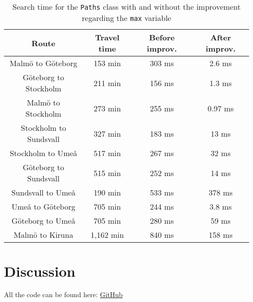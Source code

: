 \documentclass[a4paper,11pt]{article}
\begin{document}
\begin{table}[h!]
    \begin{center}
        \caption{Search time for the {\tt Paths} class with and without the improvement regarding the
                {\tt max} variable}
        \label{tab:Paths}
        \begin{tabular}{|c|c|c|c|}
            \hline
            \textbf{Route}         & \textbf{Travel time} & \textbf{Before improv.} & \textbf{After improv.} \\
            \hline
            Malmö to Göteborg      & 153 min              & 303 ms                  & 2.6 ms                 \\
            Göteborg to Stockholm  & 211 min              & 156 ms                  & 1.3 ms                 \\
            Malmö to Stockholm     & 273 min              & 255  ms                 & 0.97 ms                \\
            Stockholm to Sundsvall & 327 min              & 183  ms                 & 13 ms                  \\
            Stockholm to Umeå      & 517 min              & 267  ms                 & 32 ms                  \\
            Göteborg to Sundsvall  & 515 min              & 252  ms                 & 14 ms                  \\
            Sundsvall to Umeå      & 190 min              & 533  ms                 & 378 ms                 \\
            Umeå to Göteborg       & 705 min              & 244  ms                 & 3.8 ms                 \\
            Göteborg to Umeå       & 705 min              & 280  ms                 & 59 ms                  \\
            Malmö to Kiruna        & 1,162 min            & 840  ms                 & 158 ms                 \\
            \hline
        \end{tabular}
    \end{center}
\end{table}

\FloatBarrier
\section{Discussion}


All the code can be found here: \href{https://github.com/adrian-jonsson-sjoedin/ID1021-AlgoData/tree/main/Tasks/Hash/src}{GitHub}
\end{document}
